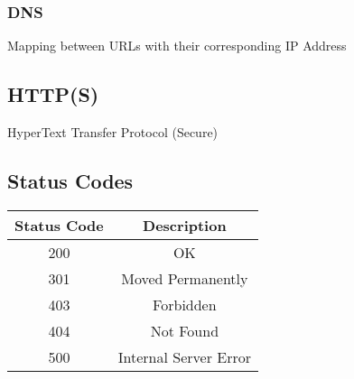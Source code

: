 \subsubsection{DNS}
Mapping between URLs with their corresponding IP Address

\subsection{HTTP(S)}
HyperText Transfer Protocol (Secure)

\subsection{Status Codes}
\begin{tabularx}{0.9\textwidth}{c | c}
	\textbf{Status Code} & \textbf{Description}  \\
	\hline
	200                  & OK                    \\
	301                  & Moved Permanently     \\
	403                  & Forbidden             \\
	404                  & Not Found             \\
	500                  & Internal Server Error
\end{tabularx}









